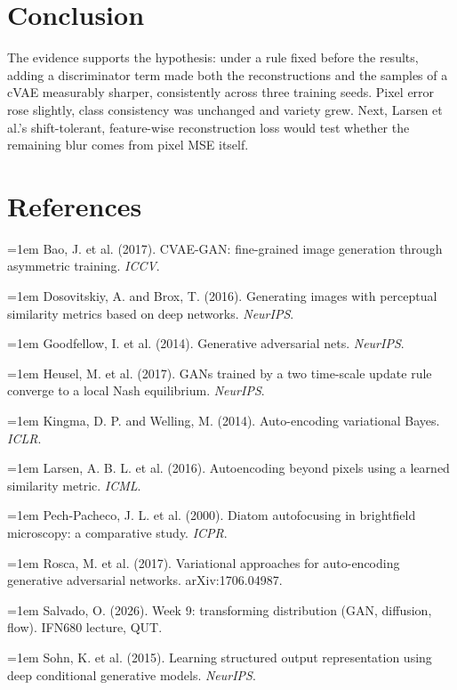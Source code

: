 \documentclass[10pt,a4paper,twocolumn]{article}
\begin{document}
\section{Conclusion}
The evidence supports the hypothesis: under a rule fixed before the results, adding a discriminator term made both the reconstructions and the samples of a cVAE measurably sharper, consistently across three training seeds. Pixel error rose slightly, class consistency was unchanged and variety grew. Next, Larsen et al.'s shift-tolerant, feature-wise reconstruction loss would test whether the remaining blur comes from pixel MSE itself.

\section*{References}
\footnotesize
\setlength{\parindent}{0pt}
\newcommand{\bib}[1]{\par\hangindent=1em #1}
\bib{Bao, J. et al. (2017). CVAE-GAN: fine-grained image
generation through asymmetric training. \emph{ICCV}.}
\bib{Dosovitskiy, A. and Brox, T. (2016). Generating images with perceptual similarity metrics
based on deep networks. \emph{NeurIPS}.}
\bib{Goodfellow, I. et al. (2014). Generative adversarial nets. \emph{NeurIPS}.}
\bib{Heusel, M. et al. (2017). GANs trained by a two time-scale update rule converge to a local
Nash equilibrium. \emph{NeurIPS}.}
\bib{Kingma, D. P. and Welling, M. (2014). Auto-encoding variational Bayes. \emph{ICLR}.}
\bib{Larsen, A. B. L. et al. (2016). Autoencoding
beyond pixels using a learned similarity metric. \emph{ICML}.}
\bib{Pech-Pacheco, J. L. et al. (2000). Diatom autofocusing in brightfield microscopy: a
comparative study. \emph{ICPR}.}
\bib{Rosca, M. et al. (2017). Variational approaches for auto-encoding generative adversarial
networks. arXiv:1706.04987.}
\bib{Salvado, O. (2026). Week 9: transforming distribution (GAN, diffusion, flow). IFN680
lecture, QUT.}
\bib{Sohn, K. et al. (2015). Learning structured output representation using deep
conditional generative models. \emph{NeurIPS}.}
\end{document}
